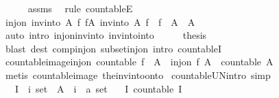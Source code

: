 \begin{isabellebody}
\ \ \ \ \isamarkupfalse%
\ assms\ \isamarkupfalse%
\ {\isacharparenleft}rule\ countableE{\isacharparenright}\isanewline
\ \ \isamarkupfalse%
\ \isamarkupfalse%
\ {\isachardoublequoteopen}inj{\isacharunderscore}on\ {\isacharparenleft}inv{\isacharunderscore}into\ A\ f{\isacharparenright}\ {\isacharparenleft}f{\isacharbackquote}A{\isacharparenright}{\isachardoublequoteclose}\ {\isachardoublequoteopen}inv{\isacharunderscore}into\ A\ f\ {\isacharbackquote}\ f\ {\isacharbackquote}\ A\ {\isasymsubseteq}\ A{\isachardoublequoteclose}\isanewline
\ \ \ \ \isamarkupfalse%
\ {\isacharparenleft}auto\ intro{\isacharcolon}\ inj{\isacharunderscore}on{\isacharunderscore}inv{\isacharunderscore}into\ inv{\isacharunderscore}into{\isacharunderscore}into{\isacharparenright}\isanewline
\ \ \isamarkupfalse%
\ \isamarkupfalse%
\ {\isacharquery}thesis\isanewline
\ \ \ \ \isamarkupfalse%
\ {\isacharparenleft}blast\ dest{\isacharcolon}\ comp{\isacharunderscore}inj{\isacharunderscore}on\ subset{\isacharunderscore}inj{\isacharunderscore}on\ intro{\isacharcolon}\ countableI{\isacharparenright}\isanewline
{}\isamarkupfalse%
%
\endisatagproof
{\isafoldproof}%
%
\isadelimproof
\isanewline
%
\endisadelimproof
\isanewline
{}\isamarkupfalse%
\ countable{\isacharunderscore}image{\isacharunderscore}inj{\isacharunderscore}on{\isacharcolon}\ {\isachardoublequoteopen}countable\ {\isacharparenleft}f\ {\isacharbackquote}\ A{\isacharparenright}\ {\isasymLongrightarrow}\ inj{\isacharunderscore}on\ f\ A\ {\isasymLongrightarrow}\ countable\ A{\isachardoublequoteclose}\isanewline
%
\isadelimproof
\ \ %
\endisadelimproof
%
\isatagproof
{}\isamarkupfalse%
\ {\isacharparenleft}metis\ countable{\isacharunderscore}image\ the{\isacharunderscore}inv{\isacharunderscore}into{\isacharunderscore}onto{\isacharparenright}%
\endisatagproof
{\isafoldproof}%
%
\isadelimproof
\isanewline
%
\endisadelimproof
\isanewline
{}\isamarkupfalse%
\ countable{\isacharunderscore}UN{\isacharbrackleft}intro{\isacharcomma}\ simp{\isacharbrackright}{\isacharcolon}\isanewline
\ \ \ I\ {\isacharcolon}{\isacharcolon}\ {\isachardoublequoteopen}{\isacharprime}i\ set{\isachardoublequoteclose}\ \ A\ {\isacharcolon}{\isacharcolon}\ {\isachardoublequoteopen}{\isacharprime}i\ {\isacharequal}{\isachargreater}\ {\isacharprime}a\ set{\isachardoublequoteclose}\isanewline
\ \ \ I{\isacharcolon}\ {\isachardoublequoteopen}countable\ I{\isachardoublequoteclose}\isanewline

\end{isabellebody}
